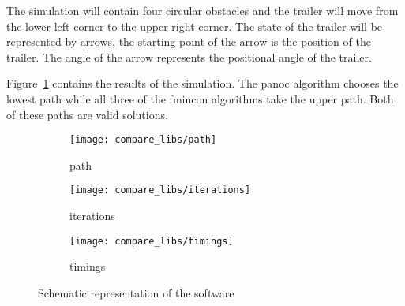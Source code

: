 The simulation will contain four circular obstacles and the trailer will move from the lower left corner to the upper right corner. The state of the trailer will be represented by arrows, the starting point of the arrow is the position of the trailer. The angle of the arrow represents the positional angle of the trailer.

Figure~\ref{fig:path} contains the results of the simulation. The panoc algorithm chooses the lowest path while all three of the fmincon algorithms take the upper path. Both of these paths are valid solutions.


\begin{figure}[H]
	\centering
	\begin{subfigure}[b]{0.45\textwidth}
		\centering
		\texttt{[image: compare\_libs/path]}
		\caption{path}
		\label{fig:path}
	\end{subfigure}
	
	\begin{subfigure}[b]{0.45\textwidth}
		\centering
		\texttt{[image: compare\_libs/iterations]}
		\caption{iterations}
		\label{fig:iterations}
	\end{subfigure}
	\hfill
	\begin{subfigure}[b]{0.45\textwidth}
		\centering
		\texttt{[image: compare\_libs/timings]}
		\caption{timings}
		\label{fig:timings}
	\end{subfigure}
	\caption{Schematic representation of the software}
\end{figure}